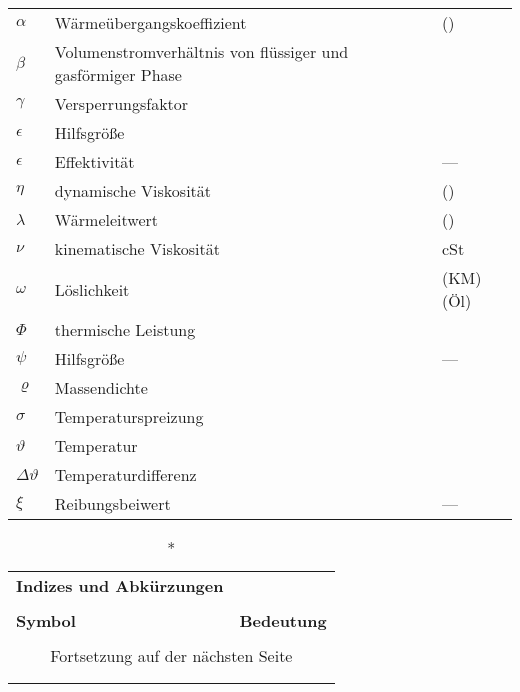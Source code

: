\begin{onehalfspacing}
\begin{longtable}[h]{p{} p{} p{}}
		$\alpha$ & Wärmeübergangskoeffizient & \watt\per(\squaremetre\usk\kelvin)\\
		$\beta$ & Volumenstromverhältnis von flüssiger und gasförmiger Phase & \pascal\\
		$\gamma$ & Versperrungsfaktor & \pascal\\
		$\epsilon$ & Hilfsgröße & \watt\\
		$\epsilon$ & Effektivität & ---\\
		$\eta$ & dynamische Viskosität & \kilogram\per(\metre\usk\second)\\
		$\lambda$ & Wärmeleitwert & \watt\per(\metre\usk\kelvin)\\
		$\nu$&kinematische Viskosität&cSt\\
		$\omega$&Löslichkeit& (\gram KM)\per(\gram Öl)\\
		$\Phi$ & thermische Leistung & \watt\\
		$\psi$ & Hilfsgröße & ---\\
		$\varrho$& Massendichte&\kilogrampercubicmetre\\
			$\sigma$&Temperaturspreizung&\kelvin\\
		$\vartheta $ & Temperatur  & \degreecelsius\\
		$\Delta\vartheta $ & Temperaturdifferenz  &\kelvin\\
		$\xi$ & Reibungsbeiwert & ---\\
		
\end{longtable}
\clearpage

\begin{longtable}[h]{p{} p{}}
		\caption*{\textbf{Indizes und Abkürzungen}} \\
		\\
		\textbf{Symbol} & \textbf{Bedeutung} \\ %
		\endhead
		\\
		\multicolumn{2}{c}{Fortsetzung auf der nächsten Seite} \\
		\endfoot
		\multicolumn{2}{c}{ } \\
		\endlastfoot
		

\end{longtable}
\end{onehalfspacing}
